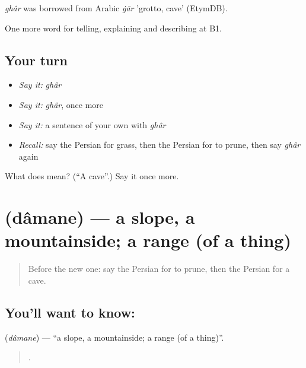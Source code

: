 \begin{cousinweb}
\emph{ghâr} was borrowed from Arabic \emph{ġār} 'grotto, cave' (EtymDB).
\end{cousinweb}

\begin{grammarlens}[title={What you've built}]
One more word for telling, explaining and describing at B1.
\end{grammarlens}

\subsection*{Your turn}
\begin{itemize}
\raggedright
  \item \emph{Say it:} \emph{ghâr}
  \item \emph{Say it:} \emph{ghâr}, once more
  \item \emph{Say it:} a sentence of your own with \emph{ghâr}
  \item \emph{Recall:} say the Persian for grass, then the Persian for to prune, then say \emph{ghâr} again
\end{itemize}

\begin{tcolorbox}[breakable,colback=teal!4,colframe=teal!35!black,title={Before you move on}]
What does  mean? (\textquotedblleft{}A cave\textquotedblright{}.) Say it once more.
\end{tcolorbox}
\section[\texorpdfstring{\fa{دامنه} (dâmane)}{دامنه (dâmane)}]{ (dâmane) — a slope, a mountainside; a range (of a thing)}

\label{lesson:FA-C468-damane}



\begin{quote}
Before the new one: say the Persian for to prune, then the Persian for a cave.
\end{quote}

\subsection*{You'll want to know: }
\textbf{} (\emph{dâmane}) — \textquotedblleft{}a slope, a mountainside; a range (of a thing)\textquotedblright{}.

\begin{quote}
    .
\end{quote}

